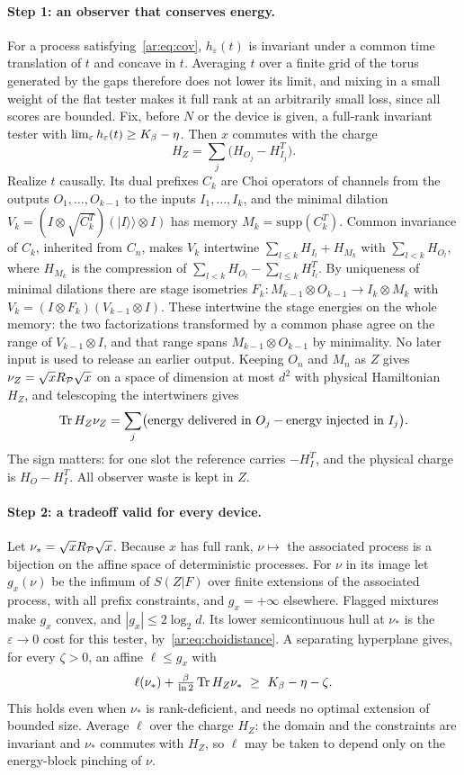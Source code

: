 \paragraph{Step 1: an observer that conserves energy.} For a process satisfying~\eqref{ar:eq:cov}, $h_\varepsilon(t)$ is invariant under a common time translation of $t$ and concave in $t$. Averaging $t$ over a finite grid of the torus generated by the gaps therefore does not lower its limit, and mixing in a small weight of the flat tester makes it full rank at an arbitrarily small loss, since all scores are bounded. Fix, before $N$ or the device is given, a full-rank invariant tester with $\lim_\varepsilon h_\varepsilon(t)\ge K_\beta-\eta$. Then $x$ commutes with the charge
\[
H_Z=\sum_j\bigl(H_{O_j}-H_{I_j}^T\bigr).
\]
Realize $t$ causally. Its dual prefixes $C_k$ are Choi operators of channels from the outputs $O_1,\dots,O_{k-1}$ to the inputs $I_1,\dots,I_k$, and the minimal dilation $V_k=(I\otimes\sqrt{C_k^T})(|I\rangle\!\rangle\otimes I)$ has memory $M_k=\mathrm{supp}(C_k^T)$. Common invariance of $C_k$, inherited from $C_n$, makes $V_k$ intertwine $\sum_{l\le k}H_{I_l}+H_{M_k}$ with $\sum_{l<k}H_{O_l}$, where $H_{M_k}$ is the compression of $\sum_{l<k}H_{O_l}-\sum_{l\le k}H_{I_l}^T$. By uniqueness of minimal dilations there are stage isometries $F_k:M_{k-1}\otimes O_{k-1}\to I_k\otimes M_k$ with $V_k=(I\otimes F_k)(V_{k-1}\otimes I)$. These intertwine the stage energies on the whole memory: the two factorizations transformed by a common phase agree on the range of $V_{k-1}\otimes I$, and that range spans $M_{k-1}\otimes O_{k-1}$ by minimality. No later input is used to release an earlier output. Keeping $O_n$ and $M_n$ as $Z$ gives $\nu_Z=\sqrt xR_\mathcal P\sqrt x$ on a space of dimension at most $d^2$ with physical Hamiltonian $H_Z$, and telescoping the intertwiners gives
\[
\operatorname{Tr} H_Z\nu_Z=\sum_j\bigl(\text{energy delivered in }O_j-\text{energy injected in }I_j\bigr).
\]
The sign matters: for one slot the reference carries $-H_I^T$, and the physical charge is $H_O-H_I^T$. All observer waste is kept in $Z$.

\paragraph{Step 2: a tradeoff valid for every device.} Let $\nu_*=\sqrt xR_\mathcal P\sqrt x$. Because $x$ has full rank, $\nu\mapsto$ the associated process is a bijection on the affine space of deterministic processes. For $\nu$ in its image let $g_x(\nu)$ be the infimum of $S(Z|F)$ over finite extensions of the associated process, with all prefix constraints, and $g_x=+\infty$ elsewhere. Flagged mixtures make $g_x$ convex, and $|g_x|\le2\log_2d$. Its lower semicontinuous hull at $\nu_*$ is the $\varepsilon\to0$ cost for this tester, by~\eqref{ar:eq:choidistance}. A separating hyperplane gives, for every $\zeta>0$, an affine $\ell\le g_x$ with
\[
\ell(\nu_*)+\tfrac{\beta}{\ln2}\operatorname{Tr} H_Z\nu_*\ \ge\ K_\beta-\eta-\zeta.
\]
This holds even when $\nu_*$ is rank-deficient, and needs no optimal extension of bounded size. Average $\ell$ over the charge $H_Z$: the domain and the constraints are invariant and $\nu_*$ commutes with $H_Z$, so $\ell$ may be taken to depend only on the energy-block pinching of $\nu$.

